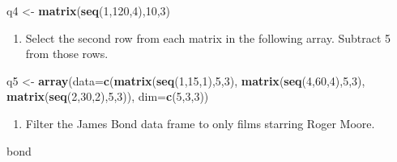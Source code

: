 \documentclass[
]{book}
\newenvironment{Shaded}{\begin{snugshade}}{\end{snugshade}}
\newcommand{\DataTypeTok}[1]{\textcolor[rgb]{0.13,0.29,0.53}{#1}}
\newcommand{\DecValTok}[1]{\textcolor[rgb]{0.00,0.00,0.81}{#1}}
\newcommand{\KeywordTok}[1]{\textcolor[rgb]{0.13,0.29,0.53}{\textbf{#1}}}
\newcommand{\NormalTok}[1]{#1}
\newcommand{\StringTok}[1]{\textcolor[rgb]{0.31,0.60,0.02}{#1}}
\providecommand{\tightlist}{%
  \setlength{\itemsep}{0pt}\setlength{\parskip}{0pt}}
\begin{document}
\begin{center}
\begin{Shaded}
\begin{Highlighting}[]
\NormalTok{q4 <-}\StringTok{ }\KeywordTok{matrix}\NormalTok{(}\KeywordTok{seq}\NormalTok{(}\DecValTok{1}\NormalTok{,}\DecValTok{120}\NormalTok{,}\DecValTok{4}\NormalTok{),}\DecValTok{10}\NormalTok{,}\DecValTok{3}\NormalTok{)}
\end{Highlighting}
\end{Shaded}

\begin{enumerate}
\def\labelenumi{\arabic{enumi}.}
\setcounter{enumi}{4}
\tightlist
\item
  Select the second row from each matrix in the following array. Subtract 5 from those rows.
\end{enumerate}

\begin{Shaded}
\begin{Highlighting}[]
\NormalTok{q5 <-}\StringTok{ }\KeywordTok{array}\NormalTok{(}\DataTypeTok{data=}\KeywordTok{c}\NormalTok{(}\KeywordTok{matrix}\NormalTok{(}\KeywordTok{seq}\NormalTok{(}\DecValTok{1}\NormalTok{,}\DecValTok{15}\NormalTok{,}\DecValTok{1}\NormalTok{),}\DecValTok{5}\NormalTok{,}\DecValTok{3}\NormalTok{),}
                  \KeywordTok{matrix}\NormalTok{(}\KeywordTok{seq}\NormalTok{(}\DecValTok{4}\NormalTok{,}\DecValTok{60}\NormalTok{,}\DecValTok{4}\NormalTok{),}\DecValTok{5}\NormalTok{,}\DecValTok{3}\NormalTok{),}
                  \KeywordTok{matrix}\NormalTok{(}\KeywordTok{seq}\NormalTok{(}\DecValTok{2}\NormalTok{,}\DecValTok{30}\NormalTok{,}\DecValTok{2}\NormalTok{),}\DecValTok{5}\NormalTok{,}\DecValTok{3}\NormalTok{)),}
            \DataTypeTok{dim=}\KeywordTok{c}\NormalTok{(}\DecValTok{5}\NormalTok{,}\DecValTok{3}\NormalTok{,}\DecValTok{3}\NormalTok{))}
\end{Highlighting}
\end{Shaded}

\begin{enumerate}
\def\labelenumi{\arabic{enumi}.}
\setcounter{enumi}{5}
\tightlist
\item
  Filter the James Bond data frame to only films starring Roger Moore.
\end{enumerate}

\begin{Shaded}
\begin{Highlighting}[]
\NormalTok{bond}
\end{Highlighting}
\end{Shaded}


\end{center}
\end{document}
